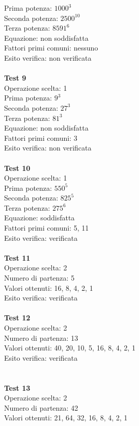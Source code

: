 \documentclass[10pt]{report}
\begin{document}
Prima potenza: $1000^3$\\
Seconda potenza: $2500^{10}$\\
Terza potenza: $8591^6$\\
Equazione: non soddisfatta\\
Fattori primi comuni: nessuno\\
Esito verifica: non verificata\\
\\
\textbf{Test 9}\\
Operazione scelta: 1\\
Prima potenza: $9^3$\\
Seconda potenza: $27^3$\\
Terza potenza: $81^3$\\
Equazione: non soddisfatta\\
Fattori primi comuni: 3\\
Esito verifica: non verificata\\
\\
\textbf{Test 10}\\ 
Operazione scelta: 1\\
Prima potenza: $550^5$\\
Seconda potenza: $825^5$\\
Terza potenza: $275^6$\\
Equazione: soddisfatta\\
Fattori primi comuni: 5, 11\\
Esito verifica: verificata 
\\
\\\textbf{Test 11} 
\\Operazione scelta: 2
\\Numero di partenza: 5
\\Valori ottenuti: 16, 8, 4, 2, 1
\\Esito verifica: verificata
\\
\\\textbf{Test 12} 
\\Operazione scelta: 2
\\Numero di partenza: 13
\\Valori ottenuti: 40, 20, 10, 5, 16, 8, 4, 2, 1
\\Esito verifica: verificata
\\
\\
\\\textbf{Test 13} 
\\Operazione scelta: 2
\\Numero di partenza: 42
\\Valori ottenuti: 21, 64, 32, 16, 8, 4, 2, 1
\end{document}
